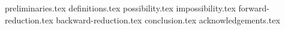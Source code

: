 
{preliminaries.tex}
{definitions.tex}
{possibility.tex}
{impossibility.tex}
{forward-reduction.tex}
{backward-reduction.tex}
{conclusion.tex}
\ifanonymous
\else
  {acknowledgements.tex}
\fi

